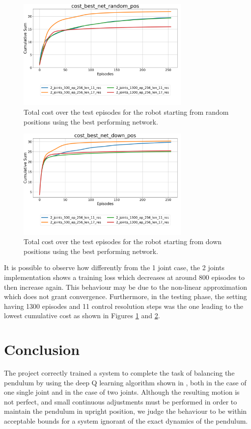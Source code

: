 \documentclass[twocolumn, a4paper]{article}
\begin{document}
\begin{figure}[H]
	\centering
	\includegraphics[width=8.5cm]{"../Figures/Summary_cost_best_net_random_pos_2J.png"}
	\caption{Total cost over the test episodes for the robot starting from
			 random positions using the best performing network.}
	\label{fig:Test_2_best_net_random_pos}
\end{figure}
\vspace{-1cm}
\begin{figure}[H]
	\centering
	\includegraphics[width=8.5cm]{"../Figures/Summary_cost_best_net_down_pos_2J.png"}
	\caption{Total cost over the test episodes for the robot starting from
			 down positions using the best performing network.}
	\label{fig:Test_2_best_net_down_pos}
	\end{figure}

It is possible to observe how differently from the 1 joint case, the 2 joints
implementation shows a training loss which decreases at around 800 episodes
to then increase again. This behaviour may be due to the non-linear
approximation which does not grant convergence.
Furthermore, in the testing phase, the setting having 1300 episodes and 11
control resolution steps was the one leading to the lowest cumulative cost
as shown in Figures
\ref{fig:Test_2_best_net_random_pos} and \ref{fig:Test_2_best_net_down_pos}.

\section{Conclusion}
The project correctly trained a system to complete the task of balancing the
pendulum by using the deep Q learning algorithm shown in \cite{Mnih}, both
in the case of one single joint and in the case of two joints. Although the
resulting motion is not perfect, and small continuous adjustments must be
performed in order to maintain the pendulum in upright position, we judge the
behaviour to be within acceptable bounds for a system ignorant of the exact
dynamics of the pendulum.
\end{document}
